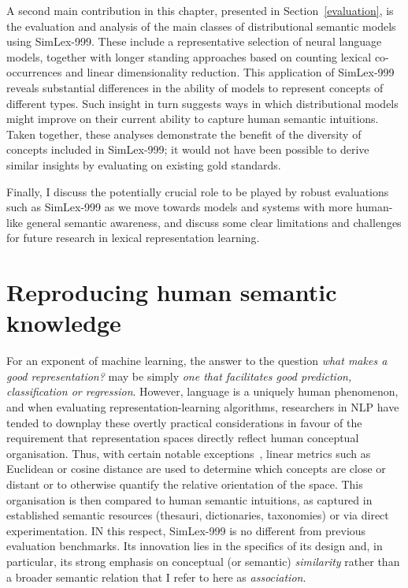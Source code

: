 A second main contribution in this chapter, presented in Section~\ref{evaluation}, is the evaluation and analysis of the main classes of distributional semantic models using SimLex-999. These include a representative selection of neural language models, together with longer standing approaches based on counting lexical co-occurrences and linear dimensionality reduction. This application of SimLex-999 reveals substantial differences in the ability of models to represent concepts of different types. Such insight in turn suggests ways in which distributional models might improve on their current ability to capture human semantic intuitions. Taken together, these analyses demonstrate the benefit of the diversity of concepts included in SimLex-999; it would not have been possible to derive similar insights by evaluating on existing gold standards.

Finally, I discuss the potentially crucial role to be played by robust evaluations such as SimLex-999 as we move towards models and systems with more human-like general semantic awareness, and discuss some clear limitations and challenges for future research in lexical representation learning. 

\section{Reproducing human semantic knowledge}

For an exponent of machine learning, the answer to the question \emph{what makes a good representation?} may be simply \emph{one that facilitates good prediction, classification or regression}. However, language is a uniquely human phenomenon, and when evaluating  representation-learning algorithms, researchers in NLP have tended to downplay these overtly practical considerations in favour of the requirement that representation spaces directly reflect human conceptual organisation. Thus, with certain notable exceptions~\citep{collobert2008unified,turian2010word}, linear metrics such as Euclidean or cosine distance are used to determine which concepts are close or distant or to otherwise quantify the relative orientation of the space. This organisation is then compared to human semantic intuitions, as captured in established semantic resources (thesauri, dictionaries, taxonomies) or via direct experimentation. IN this respect, SimLex-999 is no different from previous evaluation benchmarks. Its innovation lies in the specifics of its design and, in particular, its strong emphasis on conceptual (or semantic) \emph{similarity} rather than a broader semantic relation that I refer to here as \emph{association}.  


